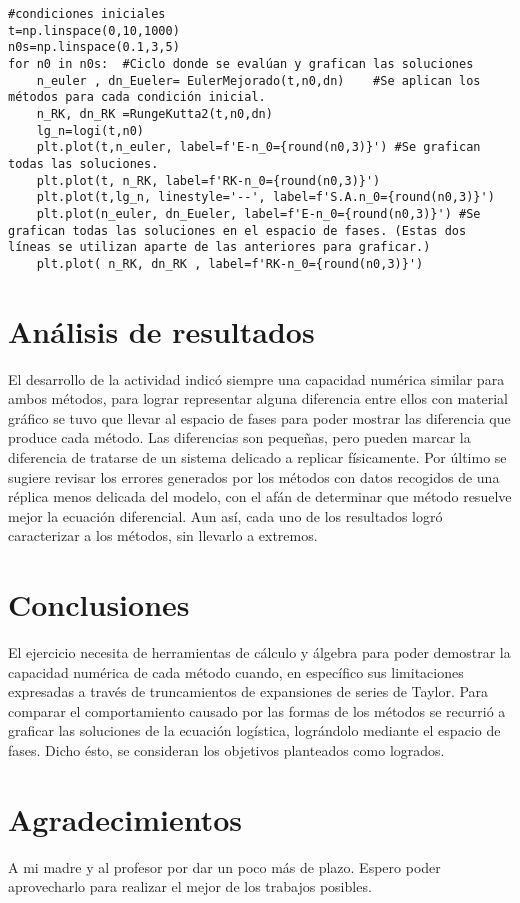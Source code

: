 \documentclass[../portafolio.tex]{subfiles}
\begin{document}
\begin{verbatim}
#condiciones iniciales
t=np.linspace(0,10,1000)
n0s=np.linspace(0.1,3,5)    
for n0 in n0s:  #Ciclo donde se evalúan y grafican las soluciones
    n_euler , dn_Eueler= EulerMejorado(t,n0,dn)    #Se aplican los métodos para cada condición inicial.
    n_RK, dn_RK =RungeKutta2(t,n0,dn)
    lg_n=logi(t,n0)
    plt.plot(t,n_euler, label=f'E-n_0={round(n0,3)}') #Se grafican todas las soluciones.
    plt.plot(t, n_RK, label=f'RK-n_0={round(n0,3)}')
    plt.plot(t,lg_n, linestyle='--', label=f'S.A.n_0={round(n0,3)}')
    plt.plot(n_euler, dn_Eueler, label=f'E-n_0={round(n0,3)}') #Se grafican todas las soluciones en el espacio de fases. (Estas dos líneas se utilizan aparte de las anteriores para graficar.)
    plt.plot( n_RK, dn_RK , label=f'RK-n_0={round(n0,3)}')  
\end{verbatim}
\section{Análisis de resultados}
El desarrollo de la actividad indicó siempre una capacidad numérica similar para ambos métodos, para lograr representar alguna diferencia entre ellos con material gráfico se tuvo que llevar al espacio de fases para poder mostrar las diferencia que produce cada método. Las diferencias son pequeñas, pero pueden marcar la diferencia de tratarse de un sistema delicado a replicar físicamente. Por último se sugiere revisar los errores generados por los métodos con datos recogidos de una réplica menos delicada del modelo, con el afán de determinar que método resuelve mejor la ecuación diferencial. Aun así, cada uno de los resultados logró caracterizar a los métodos, sin llevarlo a extremos.
\section*{Conclusiones}
El ejercicio necesita de herramientas de cálculo y álgebra para poder demostrar la capacidad numérica de cada método cuando, en específico sus limitaciones expresadas a través de truncamientos de expansiones de series de Taylor. Para comparar el comportamiento causado por las formas de los métodos se recurrió a graficar las soluciones de la ecuación logística, lográndolo mediante el espacio de fases. Dicho ésto, se consideran los objetivos planteados como logrados.
\section*{Agradecimientos}
A mi madre y al profesor por dar un poco más de plazo. Espero poder aprovecharlo para realizar el mejor de los trabajos posibles.
\end{document}
